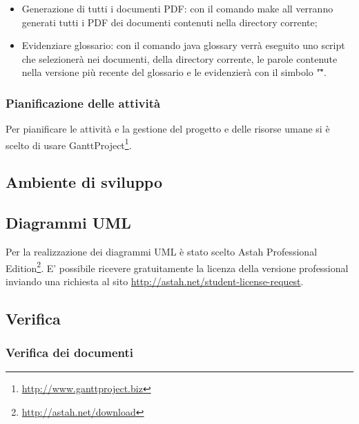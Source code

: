 \begin{itemize}
	\item Generazione di tutti i documenti PDF: con il comando make all verranno generati tutti i PDF dei documenti contenuti nella directory corrente;
	\item Evidenziare glossario: con il comando java glossary verrà eseguito uno script che selezionerà nei documenti, della directory corrente, le parole contenute nella versione più recente del glossario e le evidenzierà con il simbolo "\G".

\end{itemize}

\subsubsection{Pianificazione delle attività}
Per pianificare le attività e la gestione del progetto e delle risorse umane si è scelto di usare GanttProject\footnote{\url{http://www.ganttproject.biz}}.

\subsection{Ambiente di sviluppo}


\subsection{Diagrammi UML}

Per la realizzazione dei diagrammi UML è stato scelto Astah Professional Edition\footnote{\url{http://astah.net/download}}.
E' possibile ricevere gratuitamente la licenza della versione professional inviando una richiesta al sito \url{http://astah.net/student-license-request}.

\subsection{Verifica}

\subsubsection{Verifica dei documenti}

